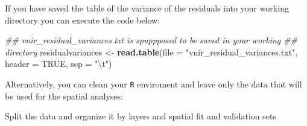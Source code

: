\documentclass[]{book}
\newenvironment{Shaded}{\begin{snugshade}}{\end{snugshade}}
\newcommand{\CharTok}[1]{\textcolor[rgb]{0.31,0.60,0.02}{#1}}
\newcommand{\CommentTok}[1]{\textcolor[rgb]{0.56,0.35,0.01}{\textit{#1}}}
\newcommand{\DataTypeTok}[1]{\textcolor[rgb]{0.13,0.29,0.53}{#1}}
\newcommand{\KeywordTok}[1]{\textcolor[rgb]{0.13,0.29,0.53}{\textbf{#1}}}
\newcommand{\NormalTok}[1]{#1}
\newcommand{\OperatorTok}[1]{\textcolor[rgb]{0.81,0.36,0.00}{\textbf{#1}}}
\newcommand{\OtherTok}[1]{\textcolor[rgb]{0.56,0.35,0.01}{#1}}
\newcommand{\StringTok}[1]{\textcolor[rgb]{0.31,0.60,0.02}{#1}}
\begin{document}
If you have saved the table of the variance of the residuals into your working directory you can execute the code below:

\begin{Shaded}
\begin{Highlighting}[]
\CommentTok{## vnir_residual_variances.txt is spuppposed to be saved in your working}
\CommentTok{## directory}
\NormalTok{residualvariances <-}\StringTok{ }\KeywordTok{read.table}\NormalTok{(}\DataTypeTok{file =} \StringTok{"vnir_residual_variances.txt"}\NormalTok{, }\DataTypeTok{header =} \OtherTok{TRUE}\NormalTok{, }
                    \DataTypeTok{sep =} \StringTok{"}\CharTok{\textbackslash{}t}\StringTok{"}\NormalTok{)}
\end{Highlighting}
\end{Shaded}

Alternatively, you can clean your \texttt{R} enviroment and leave only the data that will be used for the spatial analyses:

\begin{Shaded}
\end{Shaded}

Split the data and organize it by layers and spatial fit and validation sets
\end{document}
